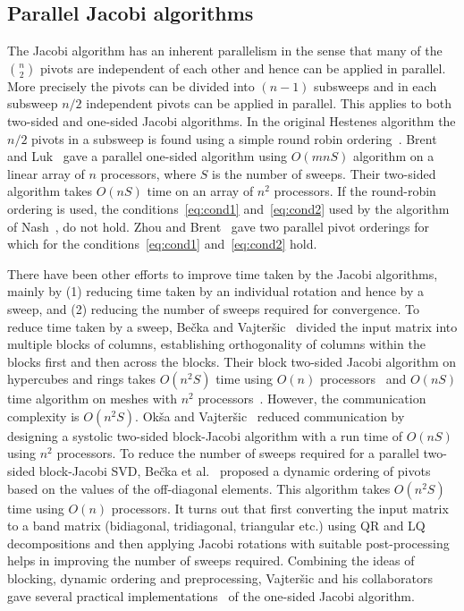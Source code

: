 \documentclass[10pt, conference, compsocconf]{IEEEtran}
\begin{document}
\subsection{Parallel Jacobi algorithms}
\label{sec:paralgo}
 
The Jacobi algorithm has an inherent parallelism in the sense that many of the ${n \choose 2}$ pivots are independent of each other and hence can be applied in parallel. More precisely the pivots can be divided into $(n-1)$ subsweeps and in each subsweep $n/2$ independent pivots can be applied in parallel. This applies to both two-sided and one-sided Jacobi algorithms. In the original Hestenes algorithm the $n/2$ pivots in a subsweep is found using a simple round robin ordering~\cite{golub2012matrix}. Brent and Luk~\cite{brent1985solution} gave a parallel one-sided algorithm using $O(mnS)$ algorithm on a linear array of $n$ processors, where $S$ is the number of sweeps. Their two-sided algorithm takes $O(nS)$ time on an array of $n^2$ processors. If the round-robin ordering is used, the conditions~\eqref{eq:cond1} and~\eqref{eq:cond2} used by the algorithm of Nash~\cite{nash1975one}, do not hold. Zhou and Brent~\cite{zhou1995parallel} gave two parallel pivot orderings for which for the conditions~\eqref{eq:cond1} and~\eqref{eq:cond2} hold.

There have been other efforts to improve time taken by the Jacobi algorithms, mainly by (1) reducing time taken by an individual rotation and hence by a sweep, and (2) reducing the number of sweeps required for convergence.  To reduce time taken by a sweep, Be{\v{c}}ka and Vajter{\v{s}}ic~\cite{bevcka1999blocka, bevcka1999blockb} divided the input matrix into multiple blocks of columns, establishing orthogonality of columns within the blocks first and then across the blocks. Their block two-sided Jacobi algorithm on hypercubes and rings takes $O(n^2 S)$ time using $O(n)$ processors~\cite{bevcka1999blocka} and $O(nS)$ time algorithm on meshes with $n^2$ processors~\cite{bevcka1999blockb}. However, the communication complexity is $O(n^2 S)$. Ok{\v{s}}a and Vajter{\v{s}}ic~\cite{okvsa2003special} reduced communication by designing a systolic two-sided block-Jacobi algorithm with a run time of $O(nS)$ using $n^2$ processors. To reduce the number of sweeps required for a parallel two-sided block-Jacobi SVD, Be{\v{c}}ka et al.~\cite{bevcka2002dynamic} proposed a dynamic ordering of pivots based on the values of the off-diagonal elements. This algorithm takes $O(n^2 S)$ time using $O(n)$ processors. It turns out that first converting the input matrix to a band matrix (bidiagonal, tridiagonal, triangular etc.) using QR and LQ decompositions and then applying Jacobi rotations with suitable post-processing helps in improving the number of sweeps required. Combining the ideas of blocking, dynamic ordering and preprocessing, Vajter{\v{s}}ic and his collaborators gave several practical implementations~\cite{bevcka2013parallel, kudo2016parallel, becka2015parallel} of the one-sided Jacobi algorithm.
\end{document}
